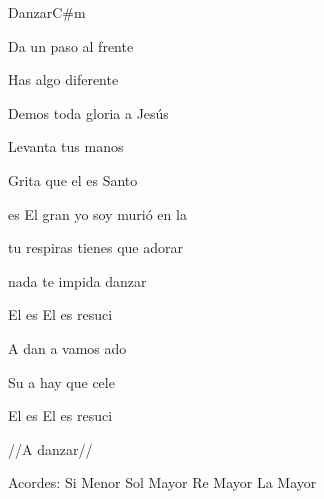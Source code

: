 \documentclass[12pt, spanish]{book}
\begin{document}
\begin{song}{Danzar}{C\#m}
\begin{SBExtraKeys}
{            

            \begin{SBOpGroup}
                Da un paso al frente

                Has algo diferente

                Demos toda gloria a Jesús

                Levanta tus manos

                Grita que el es Santo

                es El gran yo soy murió en la 
            \end{SBOpGroup}

            \begin{SBOpGroup}
                 tu respiras tienes que adorar

                 nada te impida danzar
            \end{SBOpGroup}

            \begin{SBOpGroup}
                El es  El es  resuci

                A dan a  vamos ado

                Su a hay que cele

                El es  El es  resuci

                //A danzar//
            \end{SBOpGroup}

            \ifChordBk
            \begin{SBOpGroup}
                Acordes:\break
                \upchord{\Bm}\qquad\qquad Si Menor \hfill
                \upchord{\G}\qquad Sol Mayor \hfill\null\break
                \upchord{\D}\qquad Re Mayor \hfill
                \upchord{\A}\qquad La Mayor \hfill\null\break
            \end{SBOpGroup}
            \fi

        }\end{SBExtraKeys}
    \end{song}
\end{document}
